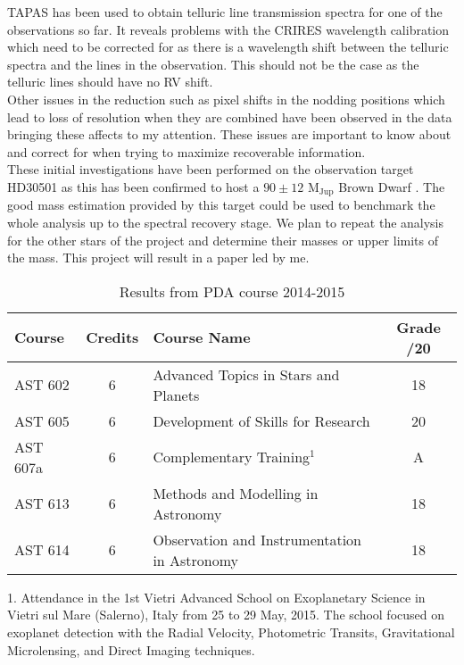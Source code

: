 \documentclass[pdftex,12pt,a4paper]{article}
\begin{document}
{TAPAS} has been used to obtain telluric line transmission spectra for one of the observations so far. It reveals problems with the CRIRES wavelength calibration which need to be corrected for as there is a wavelength shift between the telluric spectra and the lines in the observation. This should not be the case as the telluric lines should have no {RV} shift.\\

Other issues in the reduction such as pixel shifts in the nodding positions which lead to loss of resolution when they are combined have been observed in the data bringing these affects to my attention. These issues are important to know about and correct for when trying to maximize recoverable information. \\

These initial investigations have been performed on the observation target HD30501 as this has been confirmed to host a $90\pm12$ M$_{\textrm{Jup}}$ Brown Dwarf \citep{Sahlmann2011}. The good mass estimation provided by this target could be used to benchmark the whole analysis up to the spectral recovery stage. We plan to repeat the analysis for the other stars of the project and determine their masses or upper limits of the mass. This project will result in a paper led by me. \\

\begin{table}[h]
	\centering

	\begin{threeparttable}
		\caption{Results from PDA course 2014-2015}
		\begin{tabular}{ l c l c}
			\hline
			Course 	& Credits & Course Name & Grade /20\\
			\hline
			AST 602	& 6 & Advanced Topics in Stars and Planets & 18 \\
			AST 605 & 6 & Development of Skills for Research & 20 \\
			AST 607a & 6 & Complementary Training$^1$ & A \\
			AST 613 & 6 & Methods and Modelling in Astronomy & 18\\
			AST 614 & 6 & Observation and Instrumentation in Astronomy & 18\\
			\hline
		\end{tabular}
		\begin{tablenotes}
			\small
			\item 1. Attendance in the 1st Vietri Advanced School on Exoplanetary Science in Vietri sul Mare (Salerno), Italy from 25 to 29 May, 2015. The school focused on exoplanet detection with the Radial Velocity, Photometric Transits, Gravitational Microlensing, and Direct Imaging techniques.
		\end{tablenotes}
 \label{Courses_tab}
	\end{threeparttable}

\end{table}
\end{document}
